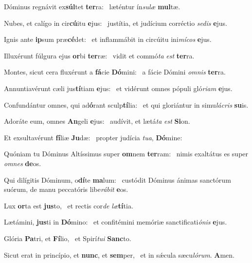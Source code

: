 \item Dóminus regnávit ex\textbf{súl}tet \textbf{ter}ra:~\psstar{} læténtur ín\textit{sulæ} \textbf{mul}tæ.
\item Nubes, et calígo in cir\textbf{cú}itu \textbf{e}jus:~\psstar{} justítia, et judícium corréctio \textit{sedis} \textbf{e}jus.
\item Ignis ante \textbf{ip}sum præ\textbf{cé}det:~\psstar{} et inflammábit in circúitu ini\textit{mícos} \textbf{e}jus.
\item Illuxérunt fúlgura ejus \textbf{or}bi \textbf{ter}ræ:~\psstar{} vidit et commó\textit{ta} \textit{est} \textbf{ter}ra.
\item Montes, sicut cera fluxérunt a \textbf{fá}cie \textbf{Dó}mini:~\psstar{} a fácie Dómini \textit{omnis} \textbf{ter}ra.
\item Annuntiavérunt cæli jus\textbf{tí}tiam \textbf{e}jus:~\psstar{} et vidérunt omnes pópuli gló\textit{riam} \textbf{e}jus.
\item Confundántur omnes, qui ad\textbf{ó}rant sculp\textbf{tí}lia:~\psstar{} et qui gloriántur in simu\textit{lácris} \textbf{su}is.
\item Adoráte eum, omnes \textbf{An}geli \textbf{e}jus:~\psstar{} audívit, et lætá\textit{ta} \textit{est} \textbf{Si}on.
\item Et exsultavérunt \textbf{fí}liæ \textbf{Ju}dæ:~\psstar{} propter judícia \textit{tua}, \textbf{Dó}mine:
\item Quóniam tu Dóminus Altíssimus super \textbf{om}nem \textbf{ter}ram:~\psstar{} nimis exaltátus es super \textit{omnes} \textbf{de}os.
\item Qui dilígitis Dóminum, o\textbf{dí}te \textbf{ma}lum:~\psstar{} custódit Dóminus ánimas sanctórum suórum, de manu peccatóris libe\textit{rábit} \textbf{e}os.
\item Lux \textbf{or}ta est \textbf{jus}to,~\psstar{} et rectis cor\textit{de} \textit{læ}\textbf{tí}tia.
\item Lætámini, \textbf{jus}ti in \textbf{Dó}mino:~\psstar{} et confitémini memóriæ sanctificati\textit{ónis} \textbf{e}jus.
\item Glória \textbf{Pa}tri, et \textbf{Fí}lio,~\psstar{} et Spirí\textit{tui} \textbf{Sanc}to.
\item Sicut erat in princípio, et \textbf{nunc}, et \textbf{sem}per,~\psstar{} et in sǽcula sæcu\textit{lórum}. \textbf{A}men.